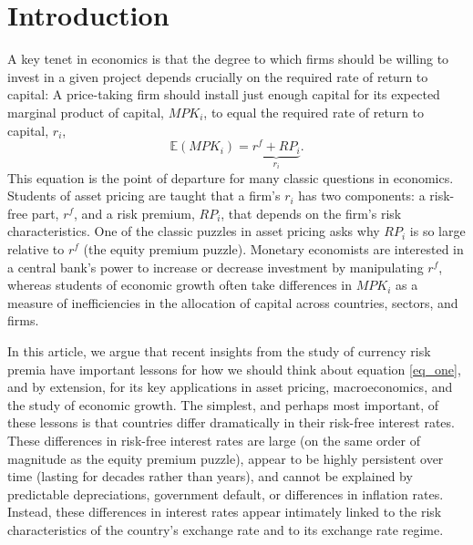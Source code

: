 \documentclass{ar-1col}
\begin{document}
\section{Introduction}


A key tenet in economics is that the degree to which firms should be willing to invest in a given project depends crucially on the required rate of return to capital: A price-taking firm should install just enough capital for its expected marginal product of capital, $MPK_i$, to equal the required rate of return to capital, $r_i$,
\begin{equation}
  \mathbb{E}\left(MPK_i\right)=\underbrace{r^f+RP_i}_{r_i}.
  \label{eq_one}
\end{equation} 
This equation is the point of departure for many classic questions in economics. Students of asset pricing are taught that a firm's $r_i$ has two components: a risk-free part, $r^f$, and a risk premium, $RP_i$, that depends on the firm's risk characteristics. One of the classic puzzles in asset pricing asks why $RP_i$ is so large relative to $r^f$ (the equity premium puzzle). Monetary economists are interested in a central bank's power to increase or decrease investment by manipulating $r^f$, whereas students of economic growth often take differences in $MPK_i$ as a measure of inefficiencies in the allocation of capital across countries, sectors, and firms.

In this article, we argue that recent insights from the study of currency risk premia have important lessons for how we should think about equation \ref{eq_one}, and by extension, for its key applications in asset pricing, macroeconomics, and the study of economic growth. The simplest, and perhaps most important, of these lessons is that countries differ dramatically in their risk-free interest rates. These differences in risk-free interest rates are large (on the same order of magnitude as the equity premium puzzle), appear to be highly persistent over time (lasting for decades rather than years), and cannot be explained by predictable depreciations, government default, or differences in inflation rates. Instead, these differences in interest rates appear intimately linked to the risk characteristics of the country's exchange rate and to its exchange rate regime.
\end{document}
